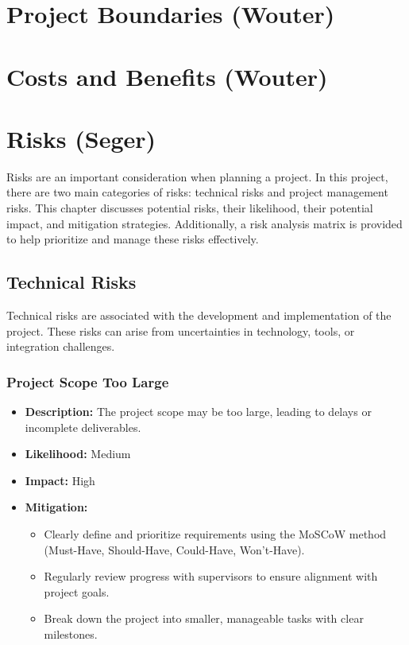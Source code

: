 \documentclass{article}
\begin{document}
\newpage
\section{Project Boundaries (Wouter)}


\newpage

\section{Costs and Benefits (Wouter)}


\newpage

\section{Risks (Seger)}
Risks are an important consideration when planning a project. In this project, there are two main categories of risks: technical risks and project management risks. This chapter discusses potential risks, their likelihood, their potential impact, and mitigation strategies. Additionally, a risk analysis matrix is provided to help prioritize and manage these risks effectively.

\subsection{Technical Risks}
Technical risks are associated with the development and implementation of the project. These risks can arise from uncertainties in technology, tools, or integration challenges.

\subsubsection{Project Scope Too Large}
\begin{itemize}
    \item \textbf{Description:} The project scope may be too large, leading to delays or incomplete deliverables.
    \item \textbf{Likelihood:} Medium
    \item \textbf{Impact:} High
    \item \textbf{Mitigation:} 
        \begin{itemize}
            \item Clearly define and prioritize requirements using the MoSCoW method (Must-Have, Should-Have, Could-Have, Won't-Have).
            \item Regularly review progress with supervisors to ensure alignment with project goals.
            \item Break down the project into smaller, manageable tasks with clear milestones.
        \end{itemize}
\end{itemize}
\end{document}
